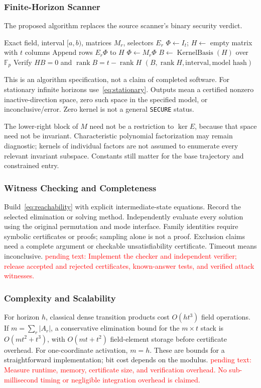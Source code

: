\documentclass[conference]{IEEEtran}
\theoremstyle{definition}
\theoremstyle{plain}
\begin{document}
\subsubsection{Finite-Horizon Scanner}
The proposed algorithm replaces the source scanner's binary security verdict.
\begin{algorithm}[t]
\small
\caption{Finite-horizon inactive-direction certificate}
\label{alg:subspace_scanner}
\begin{algorithmic}[1]
\Require Exact field, interval $[a,b)$, matrices $M_r$, selectors $E_r$
\State $\Phi\gets I_t$; $H\gets$ empty matrix with $t$ columns
  \State Append rows $E_r\Phi$ to $H$
  \State $\Phi\gets M_r\Phi$
\EndFor
\State $B\gets\operatorname{KernelBasis}(H)$ over $\mathbb F_p$
\State Verify $HB=0$ and $\operatorname{rank}B=t-\operatorname{rank}H$
\State \Return $(B,\operatorname{rank}H,\text{interval},\text{model hash})$
\end{algorithmic}
\end{algorithm}
This is an algorithm specification, not a claim of completed software.
For stationary infinite horizons use~\eqref{eq:stationary}.
Outputs mean a certified nonzero inactive-direction space, zero such
space in the specified model, or inconclusive/error.
Zero kernel is not a general \texttt{SECURE} status.

The lower-right block of $M$ need not be a restriction to $\ker E$,
because that space need not be invariant. Characteristic polynomial
factorization may remain diagnostic; kernels of individual factors are
not assumed to enumerate every relevant invariant subspace.
Constants still matter for the base trajectory and constrained entry.
\subsubsection{Witness Checking and Completeness}
Build~\eqref{eq:reachability} with explicit intermediate-state equations.
Record the selected elimination or solving method.
Independently evaluate every solution using the original permutation
and mode interface. Family identities require symbolic certificates or
proofs; sampling alone is not a proof. Exclusion claims need a complete
argument or checkable unsatisfiability certificate.
Timeout means inconclusive.
\textcolor{red}{pending text: Implement the checker and independent
verifier; release accepted and rejected certificates, known-answer tests,
and verified attack witnesses.}
\subsubsection{Complexity and Scalability}
For horizon $h$, classical dense transition products cost $O(ht^3)$
field operations. If $m=\sum_r|A_r|$, a conservative elimination bound
for the $m\times t$ stack is $O(mt^2+t^3)$, with
$O(mt+t^2)$ field-element storage before certificate overhead.
For one-coordinate activation, $m=h$. These are bounds for a
straightforward implementation; bit cost depends on the modulus.
\textcolor{red}{pending text: Measure runtime, memory, certificate size,
and verification overhead. No sub-millisecond timing or negligible
integration overhead is claimed.}
\end{document}
